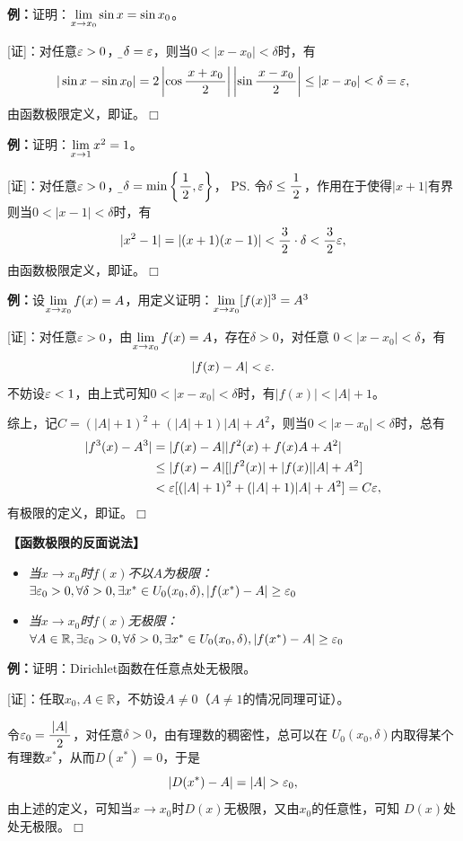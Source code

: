 {\bf 例：}证明：$\lim\limits_{x\to{x_0}}\sin x=\sin x_0$。

[证]：对任意$\varepsilon>0$，令{\b$\delta=\varepsilon$}，则当$0<|x-x_0|<\delta$时，有
$$|\sin x-\sin x_0|=2\left|\cos\displaystyle\frac{\,{x+x_0}\,}{\,{2}\,}\right|
\left|\sin\displaystyle\frac{\,{x-x_0}\,}{\,{2}\,}\right|\leq|x-x_0|<\delta=\varepsilon,$$
由函数极限定义，即证。\hfill $\Box$

{\bf 例：}证明：$\lim\limits_{x\to{1}}x^2=1$。

[证]：对任意$\varepsilon>0$，令{\b$\delta=\min\left\{\displaystyle\frac{\,{1}\,}{\,{2}\,},\varepsilon\right\}$}，
\ps{令$\delta\leq\displaystyle\frac{\,{1}\,}{\,{2}\,}$，作用在于使得$|x+1|$有界}
则当$0<|x-1|<\delta$时，有
$$|x^2-1|=|(x+1)(x-1)|<\displaystyle\frac{\,{3}\,}{\,{2}\,}\cdot\delta<\displaystyle\frac{\,{3}\,}{\,{2}\,}\varepsilon,$$
由函数极限定义，即证。\hfill $\Box$

{\bf 例：}设$\lim\limits_{x\to{x_0}}f(x)=A$，用定义证明：$\lim\limits_{x\to{x_0}}[f(x)]^3=A^3$

[证]：对任意$\varepsilon>0$，由$\lim\limits_{x\to{x_0}}f(x)=A$，存在$\delta>0$，对任意
$0<|x-x_0|<\delta$，有
$$|f(x)-A|<\varepsilon.$$
不妨设$\varepsilon<1$，由上式可知$0<|x-x_0|<\delta$时，有$|f(x)|<|A|+1$。

综上，记$C=(|A|+1)^2+(|A|+1)|A|+A^2$，则当$0<|x-x_0|<\delta$时，总有
\begin{align}
	|f^3(x)-A^3|&=|f(x)-A||f^2(x)+f(x)A+A^2|\notag\\
	&\leq |f(x)-A|[|f^2(x)|+|f(x)||A|+A^2]\notag\\
	&<\varepsilon[(|A|+1)^2+(|A|+1)|A|+A^2]=C\varepsilon\notag,
\end{align}
有极限的定义，即证。\hfill $\Box$

\begin{shaded}
	{\bf 【函数极限的反面说法】}
	
	\begin{itemize}
	  \item {\it 当$x\to x_0$时$f(x)$不以$A$为极限：} 
	    $\exists\varepsilon_0>0,\forall\delta>0, \exists x^*\in
	    U_0(x_0,\delta),|f(x^*)-A|\geq\varepsilon_0$ 
	  \item {\it 当$x\to x_0$时$f(x)$无极限：}
		$\forall A\in\mathbb{R},\exists\varepsilon_0>0,\forall\delta>0, \exists x^*\in
	    U_0(x_0,\delta),|f(x^*)-A|\geq\varepsilon_0$ 
	\end{itemize}
	
	{\bf 例：}证明：Dirichlet函数在任意点处无极限。
	
	[证]：任取$x_0,A\in\mathbb{R}$，不妨设$A\ne 0$（$A\ne 1$的情况同理可证）。
	
	令$\varepsilon_0=\displaystyle\frac{\,{|A|}\,}{\,{2}\,}$，对任意$\delta>0$，由有理数的稠密性，总可以在
	$U_0(x_0,\delta)$内取得某个有理数$x^*$，从而$D(x^*)=0$，于是
	$$|D(x^*)-A|=|A|>\e_0,$$
	由上述的定义，可知当$x\to x_0$时$D(x)$无极限，又由$x_0$的任意性，可知
	$D(x)$处处无极限。\hfill $\Box$
\end{shaded}

